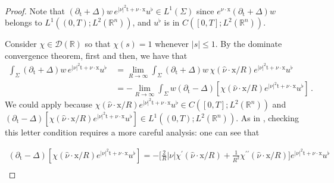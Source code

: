 \documentclass[10pt,a4paper]{amsart}
\theoremstyle{remark}
\theoremstyle{definition}
\newcommand{\R}{\mathbb{R}}
\newcommand{\tm}{\mathrm{t}}
\newcommand{\x}{\mathrm{x}}
\begin{document}
\begin{proof}
Note that
$(\partial_{\tm}+\Delta) w \, e^{|\nu|^2 \tm + \nu \cdot \x} u^\flat \in L^1(\Sigma)$
since $e^{\nu \cdot \x} ( \partial_{\tm}+\Delta) w $ belongs to 
$ L^1((0,T); L^2(\R^n))$, and $ u^\flat $ is in 
$C([0, T] ; L^{2}(\mathbb{R}^{n}))$.

Consider $\chi \in \mathcal{D}(\R)$ so that $\chi(s) = 1$ whenever $|s| \leq 1$.
By the dominate convergence theorem, first and then,  we have that
\begin{align*}
\int_{\Sigma}( \partial_{\tm}+\Delta) w \, e^{|\nu|^2 \tm + \nu \cdot \x} u^\flat \, 
&= \lim_{R\to \infty} \int_{\Sigma}( \partial_{\tm}+\Delta) w \, \chi(\hat \nu \cdot \x/R) e^{|\nu|^2 \tm + \nu \cdot \x} u^\flat \, \\
&= - \lim_{R\to \infty} \int_{\Sigma} w (\partial_{\tm}-\Delta) [\chi(\hat \nu \cdot \x/R) e^{|\nu|^2 \tm + \nu \cdot \x} u^\flat] \, .
\end{align*}
We could apply  because
$\chi(\hat \nu \cdot \x/R) e^{|\nu|^2 \tm + \nu \cdot \x} u^\flat \in C([0,T]; L^2(\R^n))$
and $(\partial_{\tm}-\Delta) [\chi(\hat \nu \cdot \x/R) e^{|\nu|^2 \tm + \nu \cdot \x} u^\flat] \in L^{1}((0, T) ; L^{2}(\mathbb{R}^{n}))$.
As in , checking this letter condition requires a more careful
analysis: one can see that
%
%

%
%
\begin{align*}
(\partial_{\tm}-\Delta) [\chi(\hat \nu \cdot \x/R) e^{|\nu|^2 \tm + \nu \cdot \x} u^\flat] =
- \Big[\frac{2}{R} |\nu| \chi^\prime (\hat \nu \cdot \x/R) + \frac{1}{R^2} \chi^{\prime \prime} (\hat \nu \cdot \x/R) \Big] e^{|\nu|^2 \tm + \nu \cdot \x} u^\flat \\

\end{align*}
\end{proof}
\end{document}
